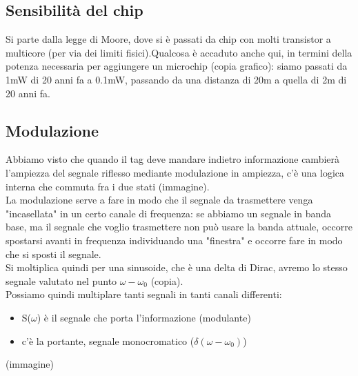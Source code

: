 \documentclass[oneside, 12pt]{extbook}
\begin{document}
\subsection{Sensibilità del chip}
Si parte dalla legge di Moore, dove si è passati da chip con molti transistor a multicore (per via dei limiti fisici).Qualcosa è accaduto anche qui, in termini della potenza necessaria per aggiungere un microchip (copia grafico): siamo passati da 1mW di 20 anni fa a 0.1mW, passando da una distanza di 20m a quella di 2m di 20 anni fa.
\subsection{Modulazione}
Abbiamo visto che quando il tag deve mandare indietro informazione cambierà l'ampiezza del segnale riflesso mediante modulazione in ampiezza, c'è una logica interna che commuta fra i due stati (immagine).\\La modulazione serve a fare in modo che il segnale da trasmettere venga "incasellata" in un certo canale di frequenza: se abbiamo un segnale in banda base, ma il segnale che voglio trasmettere non può usare la banda attuale, occorre spostarsi avanti in frequenza individuando una "finestra" e occorre fare in modo che si sposti il segnale.\\Si moltiplica quindi per una sinusoide, che è una delta di Dirac, avremo lo stesso segnale valutato nel punto $\omega - \omega_0$ (copia).\\Possiamo quindi multiplare tanti segnali in tanti canali differenti:
\begin{itemize}
	\item S($\omega$) è il segnale che porta l'informazione (modulante)
	\item c'è la portante, segnale monocromatico ($\delta(\omega - \omega_0)$)
\end{itemize}
(immagine)
\end{document}
